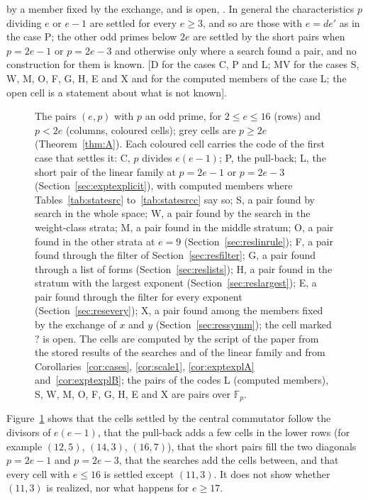 \documentclass[11pt]{article}
\theoremstyle{definition}
\theoremstyle{remark}
\newcommand{\F}{\mathbb{F}}
\begin{document}
by a member fixed by the exchange, and \ngridOpen{} is open, \ngridOpenListSixteen{}. In general the characteristics $p$ dividing $e$ or $e-1$ are settled for every $e\ge3$, and so are those with $e=de'$ as in the case P; the other odd primes below $2e$ are settled by the short pairs when $p=2e-1$ or $p=2e-3$ and otherwise only where a search found a pair, and no construction for them is known. [D for the cases C, P and L; MV for the cases S, W, M, O, F, G, H, E and X and for the computed members of the case L; the open cell is a statement about what is not known].

\begin{figure}[htbp]
\centering

\caption{The pairs $(e,p)$ with $p$ an odd prime, for $2\le e\le16$ (rows) and $p<2e$ (columns, coloured cells); grey cells are $p\ge2e$ (Theorem~\ref{thm:A}). Each coloured cell carries the code of the first case that settles it: C, $p$ divides $e(e-1)$; P, the pull-back; L, the short pair of the linear family at $p=2e-1$ or $p=2e-3$ (Section~\ref{sec:exptexplicit}), with computed members where Tables~\ref{tab:statesrc} to~\ref{tab:statesrcc} say so; S, a pair found by search in the whole space; W, a pair found by the search in the weight-class strata; M, a pair found in the middle stratum; O, a pair found in the other strata at $e=9$ (Section~\ref{sec:reslinrule}); F, a pair found through the filter of Section~\ref{sec:resfilter}; G, a pair found through a list of forms (Section~\ref{sec:reslists}); H, a pair found in the stratum with the largest exponent (Section~\ref{sec:reslargest}); E, a pair found through the filter for every exponent (Section~\ref{sec:resevery}); X, a pair found among the members fixed by the exchange of $x$ and $y$ (Section~\ref{sec:ressymm}); the cell marked $?$ is open. The cells are computed by the script of the paper from the stored results of the searches and of the linear family and from Corollaries~\ref{cor:cases}, \ref{cor:scale1}, \ref{cor:exptexplA} and~\ref{cor:exptexplB}; the pairs of the codes L (computed members), S, W, M, O, F, G, H, E and X are pairs over $\F_p$.}
\label{fig:grid}
\end{figure}

Figure~\ref{fig:grid} shows that the cells settled by the central commutator follow the divisors of $e(e-1)$, that the pull-back adds a few cells in the lower rows (for example $(12,5)$, $(14,3)$, $(16,7)$), that the short pairs fill the two diagonals $p=2e-1$ and $p=2e-3$, that the searches add the cells between, and that every cell with $e\le16$ is settled except $(11,3)$. It does not show whether $(11,3)$ is realized, nor what happens for $e\ge17$.
\end{document}
